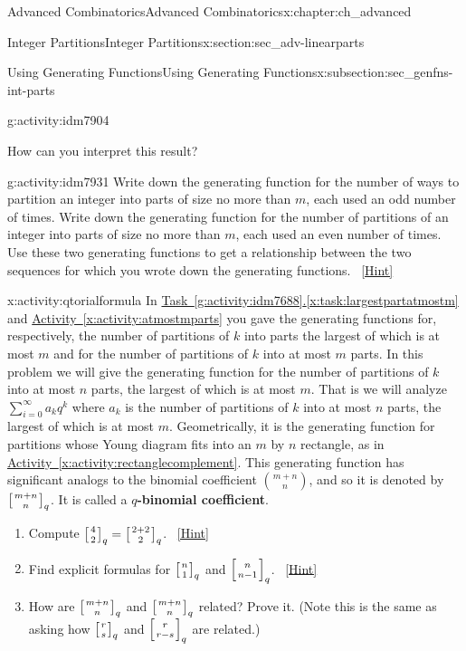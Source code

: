 \documentclass[oneside,10pt,]{book}
\newcommand{\terminology}[1]{\textbf{#1}}
\numberwithin{equation}{chapter}
\newcommand{\qchoose}[2]{\left[{#1\atop#2}\right]_q}
\begin{document}
\begin{chapterptx}{Advanced Combinatorics}{}{Advanced Combinatorics}{}{}{x:chapter:ch_advanced}
\begin{sectionptx}{Integer Partitions}{}{Integer Partitions}{}{}{x:section:sec_adv-linearparts}
\begin{subsectionptx}{Using Generating Functions}{}{Using Generating Functions}{}{}{x:subsection:sec_genfns-int-parts}
\begin{activity}{}{g:activity:idm7904}
\begin{enumerate}[font=\bfseries,label=(\alph*),ref=\alph*]
\begin{equation*}
\end{equation*}
How can you interpret this result?%
\end{enumerate}
\end{activity}
\begin{activity}{}{g:activity:idm7931}%
Write down the generating function for the number of ways to partition an integer into parts of size no more than \(m\), each used an odd number of times. Write down the generating function for the number of partitions of an integer into parts of size no more than \(m\), each used an even number of times. Use these two generating functions to get a relationship between the two sequences for which you wrote down the generating functions.%
\qquad~\hfill{\tiny\hyperlink{g:hint:idm7936-back}{[Hint]}}\end{activity}
\begin{activity}{}{x:activity:qtorialformula}%
In \hyperref[x:task:largestpartatmostm]{Task~\ref{g:activity:idm7688}.\ref{x:task:largestpartatmostm}} and \hyperref[x:activity:atmostmparts]{Activity~\ref{x:activity:atmostmparts}} you gave the generating functions for, respectively, the number of partitions of \(k\) into parts the largest of which is at most \(m\) and for the number of partitions of \(k\) into at most \(m\) parts. In this problem we will give the generating function for the number of partitions of \(k\) into at most \(n\) parts, the largest of which is at most \(m\). That is we will analyze \(\sum_{i=0}^\infty a_kq^k\) where \(a_k\) is the number of partitions of \(k\) into at most \(n\) parts, the largest of which is at most \(m\). Geometrically, it is the generating function for partitions whose Young diagram fits into an \(m\) by \(n\) rectangle, as in \hyperref[x:activity:rectanglecomplement]{Activity~\ref{x:activity:rectanglecomplement}}. This generating function has significant analogs to the binomial coefficient \(\binom{m+n}{n}\), and so it is denoted by \(\qchoose{m+n}{n}\). It is called a \terminology{\(q\)-binomial coefficient}.%
\begin{enumerate}[font=\bfseries,label=(\alph*),ref=\alph*]
\item{}Compute \(\qchoose{4}{2}=\qchoose{2+2}{2}\).%
\qquad~\hfill{\tiny\hyperlink{g:hint:idm7984-back}{[Hint]}}\item{}Find explicit formulas for \(\qchoose{n}{1}\) and \(\qchoose{n}{n-1}\).%
\qquad~\hfill{\tiny\hyperlink{g:hint:idm7994-back}{[Hint]}}\item{}How are \(\qchoose{m+n}{n}\) and \(\qchoose{m+n}{n}\) related? Prove it. (Note this is the same as asking how \(\qchoose{r}{s}\) and \(\qchoose{r}{r-s}\) are related.)%

\end{enumerate}
\end{activity}
\end{subsectionptx}
\end{sectionptx}
\end{chapterptx}
\end{document}
